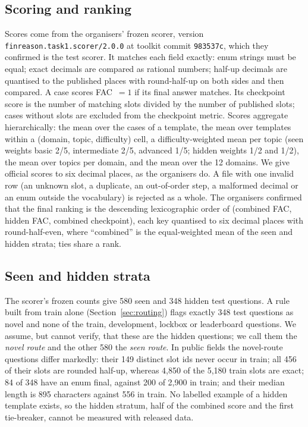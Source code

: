\documentclass[conference]{IEEEtran}
\newcommand{\id}[1]{\texttt{#1}}
\begin{document}
\subsection{Scoring and ranking}
Scores come from the organisers' frozen scorer, version \id{finreason.task1.scorer/2.0.0} at toolkit commit \id{983537c}, which they confirmed is the test scorer. It matches each field exactly: enum strings must be equal; exact decimals are compared as rational numbers; half-up decimals are quantised to the published places with round-half-up on both sides and then compared. A case scores FAC~$=1$ if its final answer matches. Its checkpoint score is the number of matching slots divided by the number of published slots; cases without slots are excluded from the checkpoint metric. Scores aggregate hierarchically: the mean over the cases of a template, the mean over templates within a (domain, topic, difficulty) cell, a difficulty-weighted mean per topic (seen weights basic 2/5, intermediate 2/5, advanced 1/5; hidden weights 1/2 and 1/2), the mean over topics per domain, and the mean over the 12 domains. We give official scores to six decimal places, as the organisers do. A file with one invalid row (an unknown slot, a duplicate, an out-of-order step, a malformed decimal or an enum outside the vocabulary) is rejected as a whole. The organisers confirmed that the final ranking is the descending lexicographic order of (combined FAC, hidden FAC, combined checkpoint), each key quantised to six decimal places with round-half-even, where ``combined'' is the equal-weighted mean of the seen and hidden strata; ties share a rank.

\subsection{Seen and hidden strata}\label{sec:strata}
The scorer's frozen counts give 580 seen and 348 hidden test questions. A rule built from train alone (Section~\ref{sec:routing}) flags exactly 348 test questions as novel and none of the train, development, lockbox or leaderboard questions. We assume, but cannot verify, that these are the hidden questions; we call them the \emph{novel route} and the other 580 the \emph{seen route}. In public fields the novel-route questions differ markedly: their 149 distinct slot ids never occur in train; all 456 of their slots are rounded half-up, whereas 4,850 of the 5,180 train slots are exact; 84 of 348 have an enum final, against 200 of 2,900 in train; and their median length is 895 characters against 556 in train. No labelled example of a hidden template exists, so the hidden stratum, half of the combined score and the first tie-breaker, cannot be measured with released data.
\end{document}
